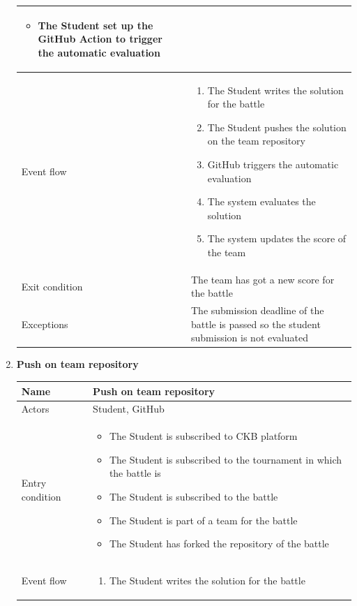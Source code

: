 \begin{enumerate}[label=UC\arabic*:]
\begin{tabular}{|p{3cm}|p{8cm}|}
\begin{itemize}
            \item The Student set up the GitHub Action to trigger the automatic evaluation
        \end{itemize} \\
        \hline
        Event flow &
        \begin{enumerate}[label=\arabic*.]
            \item The Student writes the solution for the battle
            \item The Student pushes the solution on the team repository
            \item GitHub triggers the automatic evaluation
            \item The system evaluates the solution
            \item The system updates the score of the team
        \end{enumerate} \\
        \hline
        Exit condition & The team has got a new score for the battle \\
        \hline
        Exceptions & The submission deadline of the battle is passed so the student submission is not evaluated \\
        \hline
    \end{tabular}
    \item \textbf{Push on team repository} \\
    \begin{tabular}{|p{3cm}|p{8cm}|}
        \hline
        Name & Push on team repository \\
        \hline
        Actors & Student, GitHub \\
        \hline
        Entry condition &
        \begin{itemize}
            \item The Student is subscribed to CKB platform
            \item The Student is subscribed to the tournament in which the battle is
            \item The Student is subscribed to the battle
            \item The Student is part of a team for the battle
            \item The Student has forked the repository of the battle
        \end{itemize} \\
        \hline
        Event flow &
        \begin{enumerate}[label=\arabic*.]
            \item The Student writes the solution for the battle

\end{enumerate}
\end{tabular}
\end{enumerate}

